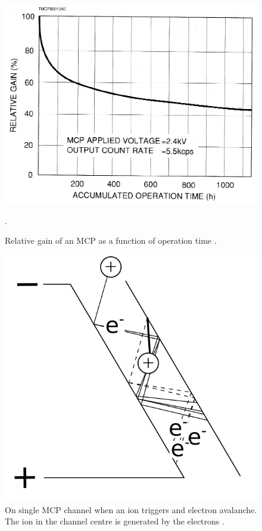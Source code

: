 	\begin{figure}[H] %
		\centering
		\includegraphics[width=.5\textwidth]{Experiments/MCP_relGain_timeevol.png}
		\caption{Relative gain of an MCP as a function of operation time \cite{LecNot_Wurz2017}.}
		\label{fig:MCPrelGainTime}.
	\end{figure}
	\begin{figure}[h!]
		\centering
		\includegraphics[width=.3\textwidth]{Experiments/DischargeMod.png}
		\caption{On single MCP channel when an ion triggers and electron avalanche. The ion in the channel centre is generated by the electrons .}
		\label{fig:expDischMod}
	\end{figure}
